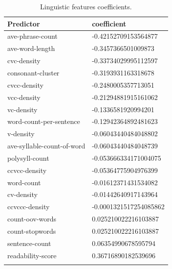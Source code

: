 \begin{table}
\begin{tabularx}{\textwidth}{|l|l|}
    \hline
    Predictor & coefficient \\ 
    \hline
    \rowcolor{LightRed}
    ave-phrase-count & -0.42152709153564877 \\
    \hline
    \rowcolor{LightRed}
    ave-word-length & -0.3457366501009873 \\
    \hline
    \rowcolor{LightRed}
    cvc-density & -0.33734029995112597\\ 
    \hline 
    \rowcolor{LightRed}
    consonant-cluster & -0.3193931163318678\\ 
    \hline 
    \rowcolor{LightRed}
    cvcc-density & -0.2480005357713051\\ 
    \hline
    \rowcolor{LightRed}
    vcc-density & -0.21294881915161062\\ 
    \hline
    \rowcolor{LightRed}
    vc-density & -0.1336581920994201\\ 
    \hline
    \rowcolor{LightRed} 
    word-count-per-sentence & -0.12942364892481623\\ 
    \hline 
    \rowcolor{LightRed}
    v-density & -0.06043440484048802\\ 
    \hline 
    \rowcolor{LightRed}
    ave-syllable-count-of-word & -0.06043440484048739\\ 
    \hline 
    \rowcolor{LightRed}
    polysyll-count & -0.053666334171004075\\ 
    \hline 
    \rowcolor{LightRed}
    ccvcc-density & -0.05364775904976399\\ 
    \hline 
    \rowcolor{LightRed}
    word-count & -0.01612371431534082\\ 
    \hline 
    \rowcolor{LightRed}
    cv-density & -0.01442640917143964\\ 
    \hline 
    \rowcolor{LightRed}
    ccvccc-density & -0.0001321517254085862\\ 
    \hline 
    \rowcolor{LightGreen}
    count-oov-words & 0.025210022216103887\\ 
    \hline 
    \rowcolor{LightGreen}
    count-stopwords & 0.025210022216103887\\ 
    \hline 
    \rowcolor{LightGreen}
    sentence-count & 0.06354990678595794\\ 
    \hline \rowcolor{LightGreen}
    readability-score & 0.36716890182539696 \\
    \hline
\caption{Linguistic features coefficients.}
\label{tab::lang_coef}
\end{tabularx}
\end{table}

